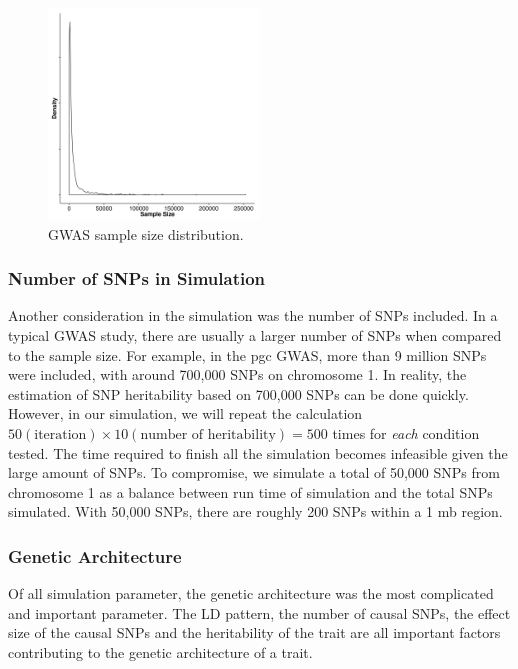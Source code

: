 			\begin{figure}
				\centering
				\includegraphics[width=0.5\textwidth]{figure/gwasSampleSize.png}
				\caption[GWAS Sample Size distribution]{
					\gls{GWAS} sample size distribution.
				}
				\label{fig:gwasCata}
			\end{figure}
			
		\subsubsection{Number of SNPs in Simulation}
			Another consideration in the simulation was the number of \glspl{SNP} included.
			In a typical \gls{GWAS} study, there are usually a larger number of \glspl{SNP} when compared to the sample size. 
			For example, in the \gls{pgc}  \gls{GWAS}, more than 9 million \glspl{SNP} were included, with around 700,000 \glspl{SNP} on chromosome 1.
			In reality, the estimation of \gls{SNP} heritability based on 700,000 \glspl{SNP} can be done quickly.
			However, in our simulation, we will repeat the calculation $50(\text{iteration})\times10(\text{number of heritability})=500$ times for \emph{each} condition tested. 
			The time required to finish all the simulation becomes infeasible given the large amount of \glspl{SNP}.
			To compromise, we simulate a total of 50,000 \glspl{SNP} from chromosome 1 as a balance between run time of simulation and the total \glspl{SNP} simulated.
			With 50,000 \glspl{SNP}, there are roughly 200 \glspl{SNP} within a 1 \gls{mb} region.
			
		\subsubsection{Genetic Architecture}
			Of all simulation parameter, the genetic architecture was the most complicated and important parameter. 
			The \gls{LD} pattern, the number of causal \glspl{SNP}, the effect size of the causal \glspl{SNP} and the heritability of the trait are all important factors contributing to the genetic architecture of a trait. 
		

